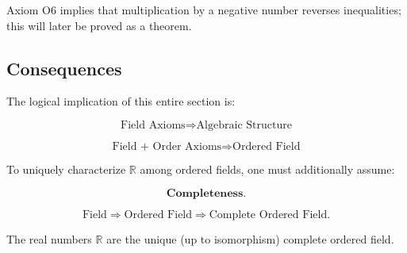 \begin{remark*}
Axiom O6 implies that multiplication by a negative number reverses
inequalities; this will later be proved as a theorem.
\end{remark*}

\subsection*{Consequences}

\begin{exposition}
The logical implication of this entire section is:
\end{exposition}

\begin{exposition}
\[
\text{Field Axioms}
\Rightarrow
\text{Algebraic Structure}
\]
\end{exposition}

\begin{exposition}
\[
\text{Field + Order Axioms}
\Rightarrow
\text{Ordered Field}
\]
\end{exposition}

\begin{exposition}
To uniquely characterize $\mathbb{R}$ among ordered fields,
one must additionally assume:
\end{exposition}

\begin{exposition}
\[
\textbf{Completeness}.
\]
\end{exposition}

\begin{remark*}
\[
\text{Field}
\Rightarrow
\text{Ordered Field}
\Rightarrow
\text{Complete Ordered Field}.
\]

The real numbers $\mathbb{R}$ are the unique (up to isomorphism)
complete ordered field.
\end{remark*}
